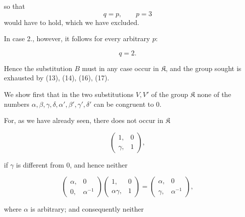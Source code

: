 
so that
\[
q=p,\qquad p=3
\]
would have to hold, which we have excluded.

In case 2., however, it follows for every arbitrary $p$:

\[ q=2. \]

Hence the substitution $B$ must in any case occur in $\mathfrak{K}$, and the group sought is exhausted by (13), (14), (16), (17).

We show first that in the two substitutions $V, V'$ of the group $\mathfrak{K}$ none of the numbers $\alpha,\beta,\gamma,\delta,\alpha',\beta',\gamma',\delta'$ can be congruent to $0$.

For, as we have already seen, there does not occur in $\mathfrak{K}$

\[ \begin{pmatrix}1, & 0\\ \gamma, & 1\end{pmatrix}, \]

if $\gamma$ is different from $0$, and hence neither

\[ \begin{pmatrix}\alpha, & 0\\ 0, & \alpha^{-1}\end{pmatrix}\begin{pmatrix}1, & 0\\ \alpha\gamma, & 1\end{pmatrix}=\begin{pmatrix}\alpha, & 0\\ \gamma, & \alpha^{-1}\end{pmatrix}, \]

where $\alpha$ is arbitrary; and consequently neither

